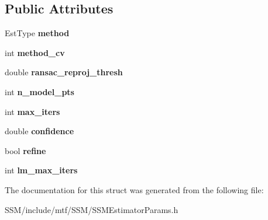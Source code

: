 \subsection*{Public Attributes}
\begin{DoxyCompactItemize}
\item 
\hypertarget{structSSMEstimatorParams_a54f300fc615a465335f76a78d70c1ee7}{Est\-Type {\bfseries method}}\label{structSSMEstimatorParams_a54f300fc615a465335f76a78d70c1ee7}

\item 
\hypertarget{structSSMEstimatorParams_ac3f84c8df01f215cf12d9597b08a91fd}{int {\bfseries method\-\_\-cv}}\label{structSSMEstimatorParams_ac3f84c8df01f215cf12d9597b08a91fd}

\item 
\hypertarget{structSSMEstimatorParams_a084c363edc9be0af34891b869df2aaab}{double {\bfseries ransac\-\_\-reproj\-\_\-thresh}}\label{structSSMEstimatorParams_a084c363edc9be0af34891b869df2aaab}

\item 
\hypertarget{structSSMEstimatorParams_a29c4e0f88258ce29a9e8f08e7083f253}{int {\bfseries n\-\_\-model\-\_\-pts}}\label{structSSMEstimatorParams_a29c4e0f88258ce29a9e8f08e7083f253}

\item 
\hypertarget{structSSMEstimatorParams_a3f4bc3108450569ad19a52454b436ab9}{int {\bfseries max\-\_\-iters}}\label{structSSMEstimatorParams_a3f4bc3108450569ad19a52454b436ab9}

\item 
\hypertarget{structSSMEstimatorParams_a33f195ee1f20a9d88284e87ce012971c}{double {\bfseries confidence}}\label{structSSMEstimatorParams_a33f195ee1f20a9d88284e87ce012971c}

\item 
\hypertarget{structSSMEstimatorParams_a30ccbdbe6e5a6a89ee70226815864ac3}{bool {\bfseries refine}}\label{structSSMEstimatorParams_a30ccbdbe6e5a6a89ee70226815864ac3}

\item 
\hypertarget{structSSMEstimatorParams_a6753209773bdf10849588e7660e26c26}{int {\bfseries lm\-\_\-max\-\_\-iters}}\label{structSSMEstimatorParams_a6753209773bdf10849588e7660e26c26}

\end{DoxyCompactItemize}


The documentation for this struct was generated from the following file\-:\begin{DoxyCompactItemize}
\item 
S\-S\-M/include/mtf/\-S\-S\-M/S\-S\-M\-Estimator\-Params.\-h\end{DoxyCompactItemize}
